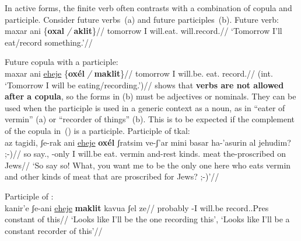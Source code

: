 In active forms, the finite verb often contrasts with a combination of copula and participle. Consider future verbs~(\nextx a) and future participles~(\nextx b).
\pex \label{ex:pres-act}
 \a Future verb:\\
 \begingl
     \gla maxar ani \{\textbf{oxal} \emph{/} \textbf{aklit}\}//
     \glb tomorrow I will.eat. {} will.record.//
     \glft `Tomorrow I'll eat/record something.'//
 \endgl

 \a Future copula with a participle:\\
 \begingl
     \gla \ljudge{\#}maxar ani \underline{eheje} \{\textbf{ox\'el} \emph{/} \textbf{maklit}\}//
     \glb tomorrow I will.be. eat. {} record.//
     \glft (int. `Tomorrow I will be eating/recording.')//
 \endgl
\xe
\cite{doron00} shows that \textbf{verbs are not allowed after a copula}, so the forms in (\lastx b) must be adjectives or nominals. They can be used when the participle is used in a generic context as a noun, as in ``eater of vermin'' (\nextx a) or ``recorder of things'' (\nextx b). This is to be expected if the complement of the copula in~(\nextx) is a participle.
\pex \label{ex:pres-act2}
 \a Participle of {tkal}:\\
 \begingl
     \gla az tagidi, ʃe-rak ani \underline{eheje} \textbf{ox\'el} ʃratsim ve-ʃ'ar mini basar ha-'asurin al jehudim? ;-)//
     \glb so say., -only I will.be eat. vermin and-rest kinds. meat the-proscribed on Jews//
     \glft `So say so! What, you want me to be the only one here who eats vermin and other kinds of meat that are proscribed for Jews? ;-)'\footnotemark//
 \endgl
{}

 \a Participle of {\thif}:\\
 \begingl
     \gla kanir'e ʃe-ani \underline{eheje} \textbf{maklit} kavua ʃel ze//
     \glb probably -I will.be record..Pres constant of this//
     \glft `Looks like I'll be the one recording this', `Looks like I'll be a constant recorder of this'//
 \endgl
\xe

